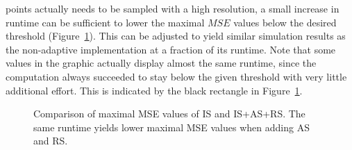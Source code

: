 points actually needs to be sampled with a high resolution, a small
increase in runtime can be sufficient to lower the maximal $MSE$
values below the desired threshold
(Figure~\ref{plot:adaptive_runtime}). This can be adjusted to yield
similar simulation results as the non-adaptive implementation at a
fraction of its runtime. Note that some values in the graphic actually
display almost the same runtime, since the computation always
succeeded to stay below the given threshold with very little
additional effort.  This is indicated by the black rectangle in
Figure~\ref{plot:adaptive_runtime}.
\begin{figure}[H]
  \centerline{
    }
  \caption{Comparison of maximal MSE values of IS and IS+AS+RS.  The
    same runtime yields lower maximal MSE values when adding AS and RS.}
\label{plot:adaptive_runtime}
\end{figure}

